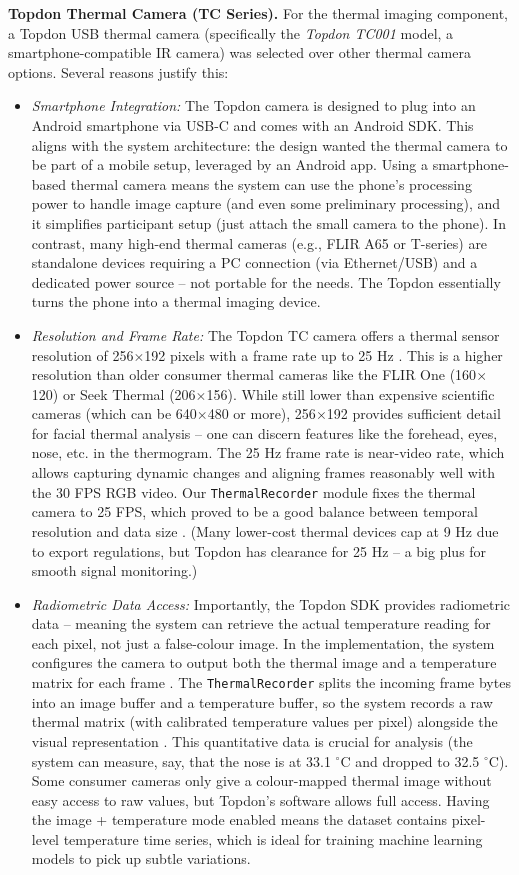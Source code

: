 \textbf{Topdon Thermal Camera (TC Series).} For the thermal imaging component, a Topdon USB thermal camera (specifically the \emph{Topdon TC001} model, a smartphone-compatible IR camera) was selected over other thermal camera options. Several reasons justify this:
\begin{itemize}
  \item \emph{Smartphone Integration:} The Topdon camera is designed to plug into an Android smartphone via USB-C and comes with an Android SDK. This aligns with the system architecture: the design wanted the thermal camera to be part of a mobile setup, leveraged by an Android app. Using a smartphone-based thermal camera means the system can use the phone's processing power to handle image capture (and even some preliminary processing), and it simplifies participant setup (just attach the small camera to the phone). In contrast, many high-end thermal cameras (e.g., FLIR A65 or T-series) are standalone devices requiring a PC connection (via Ethernet/USB) and a dedicated power source -- not portable for the needs. The Topdon essentially turns the phone into a thermal imaging device.
  \item \emph{Resolution and Frame Rate:} The Topdon TC camera offers a thermal sensor resolution of 256$\times$192 pixels with a frame rate up to 25 Hz \cite{ref20}. This is a higher resolution than older consumer thermal cameras like the FLIR One (160$\times$120) or Seek Thermal (206$\times$156). While still lower than expensive scientific cameras (which can be 640$\times$480 or more), 256$\times$192 provides sufficient detail for facial thermal analysis -- one can discern features like the forehead, eyes, nose, etc. in the thermogram. The 25 Hz frame rate is near-video rate, which allows capturing dynamic changes and aligning frames reasonably well with the 30 FPS RGB video. Our \texttt{ThermalRecorder} module fixes the thermal camera to 25 FPS, which proved to be a good balance between temporal resolution and data size \cite{ref20}. (Many lower-cost thermal devices cap at 9 Hz due to export regulations, but Topdon has clearance for 25 Hz -- a big plus for smooth signal monitoring.)
  \item \emph{Radiometric Data Access:} Importantly, the Topdon SDK provides radiometric data -- meaning the system can retrieve the actual temperature reading for each pixel, not just a false-colour image. In the implementation, the system configures the camera to output both the thermal image and a temperature matrix for each frame \cite{ref20}. The \texttt{ThermalRecorder} splits the incoming frame bytes into an image buffer and a temperature buffer, so the system records a raw thermal matrix (with calibrated temperature values per pixel) alongside the visual representation \cite{ref20}. This quantitative data is crucial for analysis (the system can measure, say, that the nose is at 33.1 $^\circ$C and dropped to 32.5 $^\circ$C). Some consumer cameras only give a colour-mapped thermal image without easy access to raw values, but Topdon's software allows full access. Having the image + temperature mode enabled \cite{ref20} means the dataset contains pixel-level temperature time series, which is ideal for training machine learning models to pick up subtle variations.

\end{itemize}
